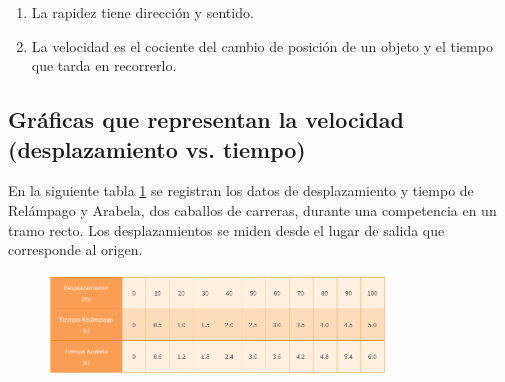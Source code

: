 \documentclass[11pt]{book}
\begin{document}
\begin{enumerate}
\begin{enumerate}
              \item La rapidez tiene dirección y sentido.\\
              \item La velocidad es el cociente del cambio de posición de un objeto y el tiempo que tarda en recorrerlo.\\
          \end{enumerate}

\end{enumerate}

\newpage
\subsection{Gr\'aficas que representan la velocidad (desplazamiento vs. tiempo)}
En la siguiente tabla \ref{tab:caballos_tabla} se registran los datos de desplazamiento y
tiempo de Relámpago y Arabela,
dos caballos de carreras, durante una competencia en un tramo recto.
Los desplazamientos se miden desde el lugar de salida que corresponde al origen.
\begin{figure}[H]
    \centering
    \includegraphics[width=0.8\textwidth]{caballos_tabla.png}
    \label{tab:caballos_tabla}
\end{figure}
\end{document}

